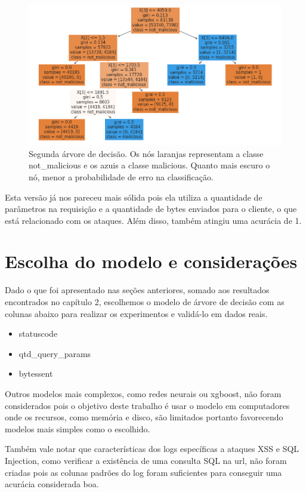 \begin{figure}
    \centering
    \includegraphics[width=.9\textwidth]{figuras/segunda_arvore.png}
    \caption{Segunda árvore de decisão. Os nós laranjas representam a classe not\_malicious 
    e os azuis a classe malicious. Quanto mais escuro o nó, menor a probabilidade de erro 
    na classificação. \label{fig:segunda_arvore}}    
\end{figure}

Esta versão já nos pareceu mais sólida pois ela utiliza a quantidade de parâmetros na requisição 
e a quantidade de bytes enviados para o cliente, o que está relacionado com os ataques. Além disso,
também atingiu uma acurácia de 1.

\section{Escolha do modelo e considerações}

Dado o que foi apresentado nas seções anteriores, somado aos resultados encontrados no capítulo 2, escolhemos o modelo de árvore de decisão com as colunas
abaixo para realizar os experimentos e validá-lo em dados reais. 

\begin{itemize}
    \item statuscode
    \item qtd\_query\_params
    \item bytessent
\end{itemize}

Outros modelos mais complexos, como redes neurais ou xgboost, não foram considerados pois o 
objetivo deste trabalho é usar o modelo em computadores onde os recursos, como memória e 
disco, são limitados portanto favorecendo modelos mais simples como o escolhido.

Também vale notar que características dos logs específicas a ataques XSS e SQL Injection, como 
verificar a existência de uma consulta SQL na url, não foram criadas pois as colunas padrões 
do log foram suficientes para conseguir uma acurácia considerada boa.

